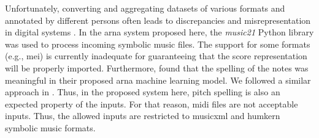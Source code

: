 

Unfortunately, converting and aggregating datasets of
various formats and annotated by different persons often
leads to discrepancies and misrepresentation in digital
systems \parencite{napoleslopez2018encoding,
napoleslopez2019effects}. In the \gls{arna} system proposed
here, the \emph{music21} Python library
\parencite{cuthbert2010music21} was used to process incoming
symbolic music files. The support for some formats (e.g.,
\gls{mei}) is currently inadequate for guaranteeing that the
score representation will be properly imported. Furthermore,
\textcite{micchi2020not} found that the spelling of the
notes was meaningful in their proposed \gls{arna} machine
learning model. We followed a similar approach in
\textcite{napoleslopez2021augmentednet}. Thus, in the
proposed system here, pitch spelling is also an expected
property of the inputs. For that reason, \gls{midi} files
are not acceptable inputs. Thus, the allowed inputs are
restricted to \gls{musicxml} and \gls{humkern} symbolic
music formats.
